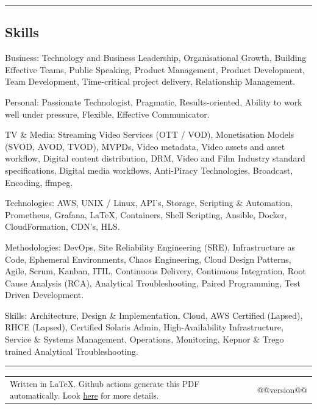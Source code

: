 \documentclass[10pt,a4paper]{article}
\makeatletter
\newenvironment{indentsection}[1]%
{\begin{list}{}%
	{\setlength{\leftmargin}{#1}}%
	\item[]%
}
{\end{list}}
\newcommand{\headerrow}[2]
{\begin{tabular*}{\linewidth}{l@{\extracolsep{\fill}}r}
	#1 &
	#2 \\
\end{tabular*}}
\makeatother
\begin{document}
\hrule
\vspace{-0.4em}
\subsection*{Skills}

\begin{indentsection}{\parindent}
\begin{description*}
		\item[Business:]
		Technology and Business Leadership, Organisational Growth, Building Effective Teams, Public Speaking, Product Management, Product Development, Team Development, Time-critical project delivery, Relationship Management.
    \item[Personal:]
		Passionate Technologist, Pragmatic, Results-oriented, Ability to work well under pressure, Flexible, Effective Communicator.
    \item[TV \& Media:]
    Streaming Video Services (OTT / VOD), Monetisation Models (SVOD, AVOD, TVOD), MVPDs, Video metadata, Video assets and asset workflow, Digital content distribution, DRM, Video and Film Industry standard specifications, Digital media workflows, Anti-Piracy Technologies, Broadcast, Encoding, ffmpeg.
    \item[Technologies:]
    AWS, UNIX / Linux, API's, Storage, Scripting \& Automation, Prometheus, Grafana, \LaTeX, Containers, Shell Scripting, Ansible, Docker, CloudFormation, CDN's, HLS.
    \item[Methodologies:]
    DevOps, Site Reliability Engineering (SRE), Infrastructure as Code, Ephemeral Environments, Chaos Engineering, Cloud Design Patterns, Agile, Scrum, Kanban, ITIL, Continuous Delivery, Continuous Integration, Root Cause Analysis (RCA), Analytical Troubleshooting, Paired Programming, Test Driven Development.
    \item[Skills:]
    Architecture, Design \& Implementation, Cloud, AWS Certified (Lapsed), RHCE (Lapsed), Certified Solaris Admin, High-Availability Infrastructure, Service \& Systems Management, Operations, Monitoring, Kepnor \& Trego trained Analytical Troubleshooting.

\end{description*}
\end{indentsection}

\hrule
\vspace{-0.4em}

\begin{description*}
  	\item
  \headerrow
    {{\textsubscript{Written in \LaTeX. Github actions generate this PDF automatically. Look \href{https://github.com/robert-will-brown/cv}{here} for more details.}}}
    {{\textsubscript{@@version@@}}}

\end{description*}
\end{document}
